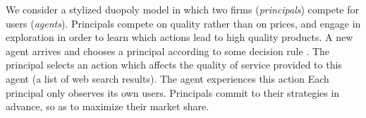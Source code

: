






 We consider a stylized duopoly model in which two firms (\emph{principals}) compete for users (\emph{agents}). Principals compete on quality rather than on prices, and engage in exploration in order to learn which actions lead to high quality products. A new agent arrives and chooses a principal according to some decision rule . The principal selects an action which affects the quality of service provided to this agent (\eg a list of web search results). The agent experiences this action   Each principal only observes its own users. Principals commit to their strategies in advance, so as to maximize their market share.



